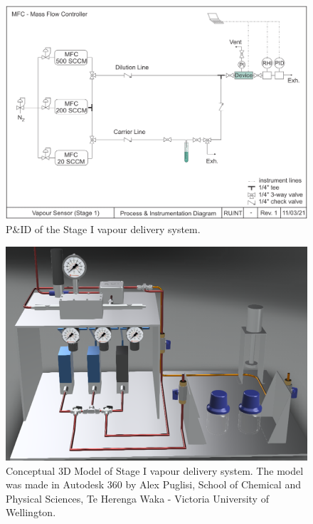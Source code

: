 \documentclass[
  a4paper,
]{scrbook}
\begin{document}
\begin{figure}

{\centering \includegraphics[width=1\textwidth,height=\textheight]{figures/ch5/PID_V1.png}

}

\caption{\label{fig-stage-1-pid}P\&ID of the Stage I vapour delivery
system.}

\end{figure}

\begin{figure}

{\centering \includegraphics[width=1\textwidth,height=\textheight]{figures/ch5/cad_V1.png}

}

\caption{\label{fig-stage-1-cad}Conceptual 3D Model of Stage I vapour
delivery system. The model was made in Autodesk 360 by Alex Puglisi,
School of Chemical and Physical Sciences, Te Herenga Waka - Victoria
University of Wellington.}

\end{figure}
\end{document}

